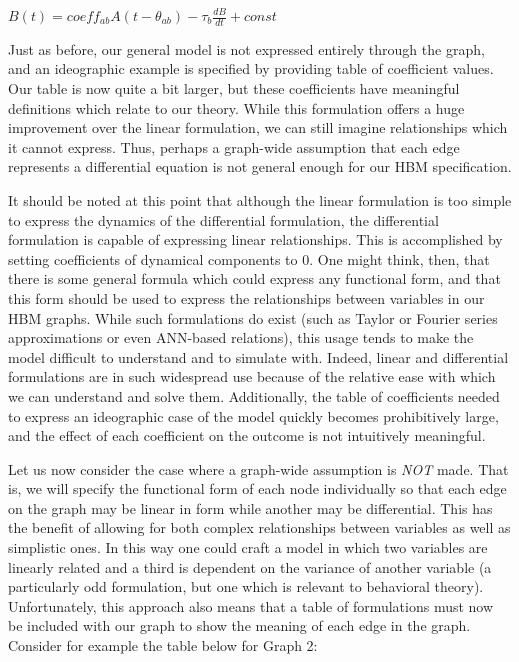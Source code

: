 \documentclass[conference]{IEEEtran}
\begin{document}
\begin{centering}
$B(t) = coeff_{ab}A(t-\theta_{ab}) - \tau_{b}\frac{dB}{dt} + const$\\
\end{centering}

Just as before, our general model is not expressed entirely through the graph, and an ideographic example is specified by providing table of coefficient values.
Our table is now quite a bit larger, but these coefficients have meaningful definitions which relate to our theory.
While this formulation offers a huge improvement over the linear formulation, we can still imagine relationships which it cannot express.
Thus, perhaps a graph-wide assumption that each edge represents a differential equation is not general enough for our HBM specification. 

It should be noted at this point that although the linear formulation is too simple to express the dynamics of the differential formulation, the differential formulation is capable of expressing linear relationships.
This is accomplished by setting coefficients of dynamical components to 0.
One might think, then, that there is some general formula which could express any functional form, and that this form should be used to express the relationships between variables in our HBM graphs.
While such formulations do exist (such as Taylor or Fourier series approximations or even ANN-based relations), this usage tends to make the model difficult to understand and to simulate with.
Indeed, linear and differential formulations are in such widespread use because of the relative ease with which we can understand and solve them. 
Additionally, the table of coefficients needed to express an ideographic case of the model quickly becomes prohibitively large, and the effect of each coefficient on the outcome is not intuitively meaningful.

Let us now consider the case where a graph-wide assumption is \emph{NOT} made.
That is, we will specify the functional form of each node individually so that each edge on the graph may be linear in form while another may be differential.
This has the benefit of allowing for both complex relationships between variables as well as simplistic ones.
In this way one could craft a model in which two variables are linearly related and a third is dependent on the variance of another variable (a particularly odd formulation, but one which is relevant to behavioral theory).
Unfortunately, this approach also means that a table of formulations must now be included with our graph to show the meaning of each edge in the graph.
Consider for example the table below for Graph 2:
\end{document}
